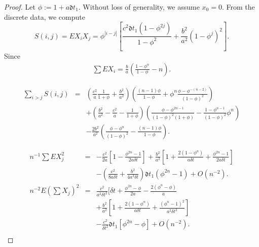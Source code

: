 \documentclass[12pt,reqno, a4paper]{article}
\numberwithin{equation}{section}
\begin{document}
\begin{proof}
Let $\phi:=1+a\mathfrak{d} t_1$.   Without loss of generality, we assume $x_0=0$. %
    From the discrete data, we compute $$ S(i,j)=EX_iX_{j}=\phi^{|i-j|}[\frac {c^2\mathfrak{d} t_1(1-\phi^{2j})}{1-\phi^2}+\frac {b^2}{a^2}(1-\phi^j)^2].$$
Since
  \begin{eqnarray*}\sum E X_i=\frac {b}{a}(\frac {1-\phi^n}{1-\phi}-n). \end{eqnarray*}

 \begin{eqnarray*}\sum_{i>j} S(i,j)&=&(\frac {c^2}{a}\frac 1 {1+\phi}+\frac {b^2}{a^2})(\frac {(n-1)\phi}{1-\phi}+\phi^{n}\frac {\phi-\phi^{-(n-2)}}{(1-\phi)^2})\\&&+(\frac {b^2}{a^2}-\frac {c^2}{a}-\frac 1 {1+\phi})(\frac {\phi-\phi^{2n-1}}{(1-\phi)^2(1+\phi)}-\frac {1-\phi^{n-1}}{(1-\phi)^2}\phi^n)\\&&-\frac {2b^2}{a^2}(\frac {\phi-\phi^{n}}{(1-\phi)^2}-\frac {(n-1)\phi}{1-\phi}). \end{eqnarray*}

\begin{eqnarray*}
n^{-1}\sum EX_{j}^2&=&-\frac {c^2}{2a}[1-\frac {\phi^{2n}-1}{2a \delta t}]+\frac {b^2}{a^2}[1+\frac {2(1-\phi^n)} {a\delta t}
+\frac{\phi^{2n}-1}{2a \delta t}]\\&&-(\frac {c^2} {8a\delta t}+\frac {b^2}{4a^3\delta t})\mathfrak{d} t_1(\phi^{2n}-1)+ O(n^{-2}).\\
n^{-2}E(\sum X_{j})^2&=&\frac {c^2}{a^2\delta t^2}[\delta t+\frac {\phi^{2n}-\phi}{2a }-\frac {2(\phi^n-\phi)} {a}\\&&+\frac {b^2}{a^2}[1+\frac {2(1-\phi^n)} {a\delta t}
+\frac{(\phi^{n}-1)^2}{a^2 \delta t^2}]\\&&-\frac {c^2}{\delta t^2}\mathfrak{d} t_1[\phi^{2n}-\phi]+O(n^{-2}).\\
\end{eqnarray*}


\end{proof}
\end{document}
